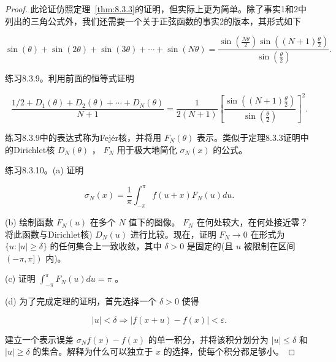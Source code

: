 \begin{proof}
  
此论证仿照定理~\ref{thm:8.3.3}的证明，但实际上更为简单。除了事实1和2中列出的三角公式外，我们还需要一个关于正弦函数的事实2的版本，其形式如下

\[
\sin \left( \theta \right)  + \sin \left( {2\theta }\right)  + \sin \left( {3\theta }\right)  + \cdots  + \sin \left( {N\theta }\right)  = \frac{\sin \left( \frac{N\theta }{2}\right) \sin \left( {\left( {N + 1}\right) \frac{\theta }{2}}\right) }{\sin \left( \frac{\theta }{2}\right) }.
\]

练习8.3.9。利用前面的恒等式证明

\[
\frac{1/2 + {D}_{1}\left( \theta \right)  + {D}_{2}\left( \theta \right)  + \cdots  + {D}_{N}\left( \theta \right) }{N + 1} = \frac{1}{2\left( {N + 1}\right) }{\left\lbrack  \frac{\sin \left( {\left( {N + 1}\right) \frac{\theta }{2}}\right) }{\sin \left( \frac{\theta }{2}\right) }\right\rbrack  }^{2}.
\]

练习8.3.9中的表达式称为Fej\'er核，并将用 \({F}_{N}\left( \theta \right)\) 表示。类似于定理8.3.3证明中的Dirichlet核 \({D}_{N}\left( \theta \right)\) ， \({F}_{N}\) 用于极大地简化 \({\sigma }_{N}\left( x\right)\) 的公式。

练习8.3.10。(a) 证明

\[
{\sigma }_{N}\left( x\right)  = \frac{1}{\pi }{\int }_{-\pi }^{\pi }f\left( {u + x}\right) {F}_{N}\left( u\right) {du}.
\]

(b) 绘制函数 \({F}_{N}\left( u\right)\) 在多个 \(N\) 值下的图像。 \({F}_{N}\) 在何处较大，在何处接近零？将此函数与Dirichlet核) \({D}_{N}\left( u\right)\) 进行比较。现在，证明 \({F}_{N} \rightarrow  0\) 在形式为 \(\{ u : \left| u\right|  \geq  \delta \}\) 的任何集合上一致收敛，其中 \(\delta  > 0\) 是固定的(且 \(u\) 被限制在区间 \(\left( {-\pi ,\pi \rbrack }\right)\) 内)。

(c) 证明 \({\int }_{-\pi }^{\pi }{F}_{N}\left( u\right) {du} = \pi\) 。

(d) 为了完成定理的证明，首先选择一个 \(\delta  > 0\) 使得

\[
\left| u\right|  < \delta \Rightarrow \left| {f\left( {x + u}\right)  - f\left( x\right) }\right|  < \varepsilon .
\]

建立一个表示误差 \({\sigma }_{N}f\left( x\right)  - f\left( x\right)\) 的单一积分，并将该积分划分为 \(\left| u\right|  \leq  \delta\) 和 \(\left| u\right|  \geq  \delta\) 的集合。解释为什么可以独立于 \(x\) 的选择，使每个积分都足够小。
\end{proof}

